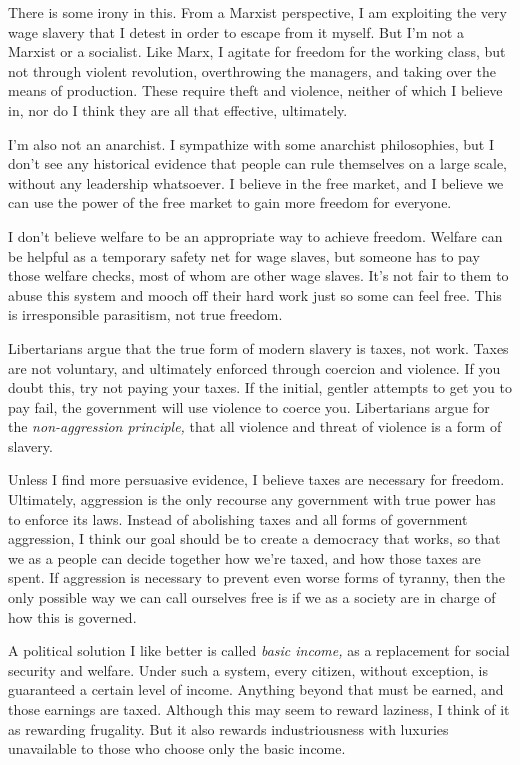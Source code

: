 There is some irony in this. From a Marxist perspective, I am exploiting the very wage slavery that I detest in order to escape from it myself. But I'm not a Marxist or a socialist. Like Marx, I agitate for freedom for the working class, but not through violent revolution, overthrowing the managers, and taking over the means of production. These require theft and violence, neither of which I believe in, nor do I think they are all that effective, ultimately.

I'm also not an anarchist. I sympathize with some anarchist philosophies, but I don't see any historical evidence that people can rule themselves on a large scale, without any leadership whatsoever. I believe in the free market, and I believe we can use the power of the free market to gain more freedom for everyone.

I don't believe welfare to be an appropriate way to achieve freedom. Welfare can be helpful as a temporary safety net for wage slaves, but someone has to pay those welfare checks, most of whom are other wage slaves. It's not fair to them to abuse this system and mooch off their hard work just so some can feel free. This is irresponsible parasitism, not true freedom.

Libertarians argue that the true form of modern slavery is taxes, not work. Taxes are not voluntary, and ultimately enforced through coercion and violence. If you doubt this, try not paying your taxes. If the initial, gentler attempts to get you to pay fail, the government will use violence to coerce you. Libertarians argue for the \emph{non-aggression principle,} that all violence and threat of violence is a form of slavery.

Unless I find more persuasive evidence, I believe taxes are necessary for freedom. Ultimately, aggression is the only recourse any government with true power has to enforce its laws. Instead of abolishing taxes and all forms of government aggression, I think our goal should be to create a democracy that works, so that we as a people can decide together how we're taxed, and how those taxes are spent. If aggression is necessary to prevent even worse forms of tyranny, then the only possible way we can call ourselves free is if we as a society are in charge of how this is governed.

A political solution I like better is called \emph{basic income,} as a replacement for social security and welfare. Under such a system, every citizen, without exception, is guaranteed a certain level of income. Anything beyond that must be earned, and those earnings are taxed. Although this may seem to reward laziness, I think of it as rewarding frugality. But it also rewards industriousness with luxuries unavailable to those who choose only the basic income.

